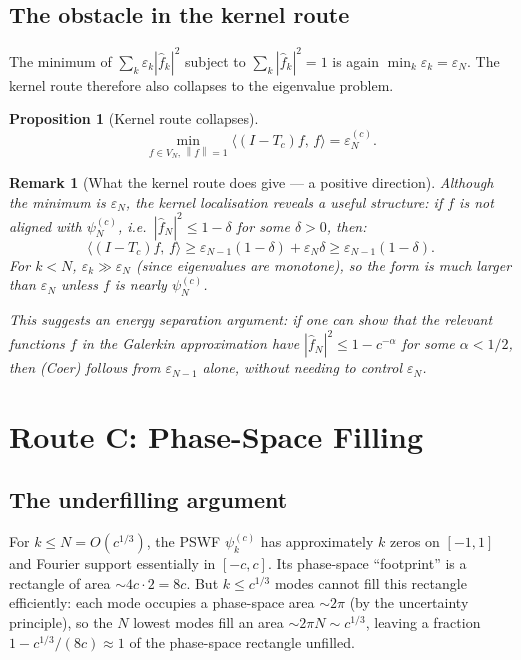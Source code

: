 \documentclass[12pt,a4paper]{article}
\newtheorem{proposition}[theorem]{Proposition}
\newtheorem{remark}[theorem]{Remark}
\newcommand{\pswf}[1]{\psi_{#1}^{(c)}}
\newcommand{\Tc}{T_c}
\newcommand{\VN}{V_N}
\newcommand{\inner}[2]{\langle #1,\, #2 \rangle}
\newcommand{\norm}[1]{\left\|#1\right\|}
\begin{document}
\subsection{The obstacle in the kernel route}

The minimum of $\sum_k \varepsilon_k |\hat f_k|^2$
subject to $\sum_k |\hat f_k|^2 = 1$ is again
$\min_k \varepsilon_k = \varepsilon_N$.
The kernel route therefore also collapses to
the eigenvalue problem.

\begin{proposition}[Kernel route collapses]
\label{prop:kernel_collapse}
\[
  \min_{f \in \VN,\, \norm{f}=1}
  \inner{(I-\Tc)f}{f}
  = \varepsilon_N^{(c)}.
\]
\end{proposition}

\begin{remark}[What the kernel route does give --- a positive direction]
\label{rem:kernel_positive}
Although the minimum is $\varepsilon_N$,
the kernel localisation reveals a useful structure:
if $f$ is \emph{not} aligned with $\pswf{N}$,
i.e.\ $|\hat f_N|^2 \leq 1 - \delta$ for some $\delta > 0$,
then:
\[
  \inner{(I-\Tc)f}{f}
  \geq \varepsilon_{N-1}(1-\delta) + \varepsilon_N \delta
  \geq \varepsilon_{N-1}(1-\delta).
\]
For $k < N$, $\varepsilon_k \gg \varepsilon_N$
(since eigenvalues are monotone), so
the form is much larger than $\varepsilon_N$
unless $f$ is nearly $\pswf{N}$.

\medskip\noindent
This suggests an \emph{energy separation argument}:
if one can show that the relevant functions
$f$ in the Galerkin approximation have
$|\hat f_N|^2 \leq 1 - c^{-\alpha}$
for some $\alpha < 1/2$, then (Coer)
follows from $\varepsilon_{N-1}$ alone,
without needing to control $\varepsilon_N$.
\end{remark}

\section{Route C: Phase-Space Filling}
\label{sec:phasespace}

\subsection{The underfilling argument}

For $k \leq N = O(c^{1/3})$, the PSWF $\pswf{k}$
has approximately $k$ zeros on $[-1,1]$ and
Fourier support essentially in $[-c,c]$.
Its phase-space ``footprint'' is a rectangle of
area $\sim 4c \cdot 2 = 8c$.
But $k \leq c^{1/3}$ modes cannot fill this
rectangle efficiently: each mode occupies
a phase-space area $\sim 2\pi$ (by the
uncertainty principle), so the $N$ lowest modes
fill an area $\sim 2\pi N \sim c^{1/3}$,
leaving a fraction $1 - c^{1/3}/(8c) \approx 1$
of the phase-space rectangle unfilled.
\end{document}
